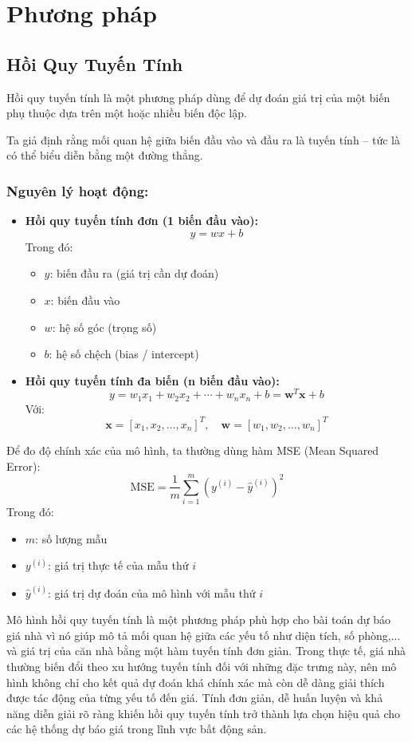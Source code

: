\section{Phương pháp}
\subsection{Hồi Quy Tuyến Tính}
Hồi quy tuyến tính là một phương pháp dùng để dự đoán giá trị của một biến phụ thuộc dựa trên một hoặc nhiều biến độc lập.

Ta giả định rằng mối quan hệ giữa biến đầu vào và đầu ra là tuyến tính – tức là có thể biểu diễn bằng một đường thẳng.
\subsubsection*{Nguyên lý hoạt động:}
\begin{itemize}
    \item \textbf{Hồi quy tuyến tính đơn (1 biến đầu vào):}
    \[
        y = wx + b
    \]
    Trong đó:
    \begin{itemize}
        \item $y$: biến đầu ra (giá trị cần dự đoán)
        \item $x$: biến đầu vào
        \item $w$: hệ số góc (trọng số)
        \item $b$: hệ số chệch (bias / intercept)
    \end{itemize}
    
    \item \textbf{Hồi quy tuyến tính đa biến (n biến đầu vào):}
    \[
        y = w_1x_1 + w_2x_2 + \cdots + w_nx_n + b = \mathbf{w}^T \mathbf{x} + b
    \]
    Với:
    \[
        \mathbf{x} = [x_1, x_2, \ldots, x_n]^T,\quad \mathbf{w} = [w_1, w_2, \ldots, w_n]^T
    \]
\end{itemize}
Để đo độ chính xác của mô hình, ta thường dùng hàm MSE (Mean Squared Error):
\[
    \text{MSE} = \frac{1}{m} \sum_{i=1}^{m} \left( y^{(i)} - \hat{y}^{(i)} \right)^2
\]
Trong đó:
\begin{itemize}
    \item $m$: số lượng mẫu
    \item $y^{(i)}$: giá trị thực tế của mẫu thứ $i$
    \item $\hat{y}^{(i)}$: giá trị dự đoán của mô hình với mẫu thứ $i$
\end{itemize}

Mô hình hồi quy tuyến tính là một phương pháp phù hợp cho bài toán dự báo giá nhà vì nó giúp mô tả mối quan hệ giữa các yếu tố như diện tích, số phòng,... và giá trị của căn nhà bằng một hàm tuyến tính đơn giản. Trong thực tế, giá nhà thường biến đổi theo xu hướng tuyến tính đối với những đặc trưng này, nên mô hình không chỉ cho kết quả dự đoán khá chính xác mà còn dễ dàng giải thích được tác động của từng yếu tố đến giá. Tính đơn giản, dễ huấn luyện và khả năng diễn giải rõ ràng khiến hồi quy tuyến tính trở thành lựa chọn hiệu quả cho các hệ thống dự báo giá trong lĩnh vực bất động sản.

